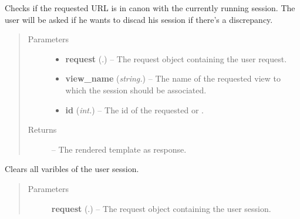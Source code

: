 \documentclass[letterpaper,10pt,english]{sphinxmanual}
\begin{document}
\begin{fulllineitems}
\label{Contour.contour:Contour.contour.views.check_session}
Checks if the requested URL is in canon with the currently running session. The user will be asked if he wants to discad his session if there's a discrepancy.
\begin{quote}\begin{description}
\item[{Parameters}] \leavevmode\begin{itemize}
\item {} 
\textbf{request} (.) -- The request object containing the user request.

\item {} 
\textbf{view\_name} (\emph{string.}) -- The name of the requested view to which the session should be associated.

\item {} 
\textbf{id} (\emph{int.}) -- The id of the requested {\hyperref[Contour.contour:Contour.contour.models.Image]{}} or {\hyperref[Contour.contour:Contour.contour.models.Track]{}}.

\end{itemize}

\item[{Returns}] \leavevmode
{} -- The rendered template as response.

\end{description}\end{quote}

\end{fulllineitems}


\begin{fulllineitems}
\label{Contour.contour:Contour.contour.views.clear_session}
Clears all varibles of the user session.
\begin{quote}\begin{description}
\item[{Parameters}] \leavevmode
\textbf{request} (.) -- The request object containing the user session.

\end{description}\end{quote}

\end{fulllineitems}
\end{document}
